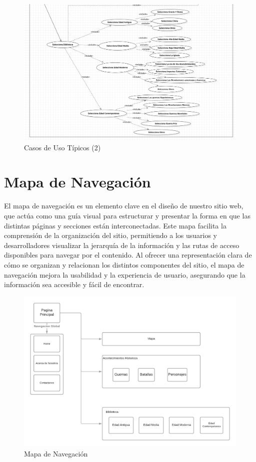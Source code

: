 \documentclass{article}
\begin{document}
\begin{figure}[H]
    \centering
    \includegraphics[width=1\textwidth]{Esquemas/CasosDeUsoSegamentado(2).jpg}
    \caption{Casos de Uso Típicos (2)}
    \label{fig:mi_imagen}
\end{figure}

\newpage

\section{Mapa de Navegación}

El mapa de navegación es un elemento clave en el diseño de nuestro sitio web, que actúa como una guía visual para estructurar y presentar la forma en que las distintas páginas y secciones están interconectadas. Este mapa facilita la comprensión de la organización del sitio, permitiendo a los usuarios y desarrolladores visualizar la jerarquía de la información y las rutas de acceso disponibles para navegar por el contenido. Al ofrecer una representación clara de cómo se organizan y relacionan los distintos componentes del sitio, el mapa de navegación mejora la usabilidad y la experiencia de usuario, asegurando que la información sea accesible y fácil de encontrar.

\begin{figure}[H]
    \centering
    \includegraphics[width=1\textwidth]{Esquemas/MapawebFinal.png}
    \caption{Mapa de Navegación}
    \label{fig:mi_imagen}
\end{figure}
\end{document}
